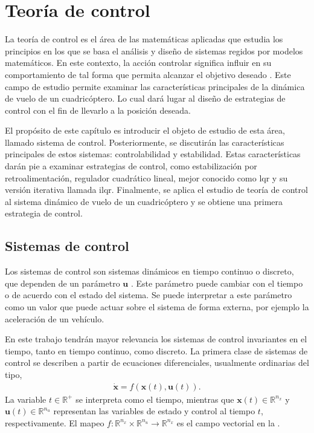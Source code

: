 \chapter{Teoría de control}
\label{chapter:control_theory}
La teoría de control es el área de las matemáticas aplicadas que estudia los principios en los que se basa el análisis y diseño de sistemas regidos por modelos matemáticos. En este contexto, la acción controlar significa influir en su comportamiento de tal forma que permita alcanzar el objetivo deseado \cite{Sontag1998}. Este campo de estudio permite examinar las características principales de la dinámica de vuelo de un cuadricóptero. Lo cual dará lugar al diseño de estrategias de control con el fin de llevarlo a la posición deseada.

El propósito de este capítulo es  introducir el objeto de estudio de esta área, llamado sistema de control. Posteriormente, se discutirán las características principales de estos sistemas: controlabilidad y estabilidad. Estas características darán pie a examinar estrategias de control, como estabilización por retroalimentación, regulador cuadrático lineal, mejor conocido como \acrfull{lqr} y su versión iterativa llamada \acrfull{ilqr}. Finalmente, se aplica el estudio de teoría de control al sistema dinámico de vuelo de un cuadricóptero y se obtiene una primera estrategia de control.

\section{Sistemas de control}

Los sistemas de control son sistemas dinámicos en tiempo continuo o discreto, que dependen de un parámetro $\mathbf{u}$ \cite{Gruene2021}. Este parámetro puede cambiar con el tiempo o de acuerdo con el estado del sistema. Se puede interpretar a este parámetro como un valor que puede actuar sobre el sistema de forma externa, por ejemplo la aceleración de un vehículo.

En este trabajo tendrán mayor relevancia los sistemas de control invariantes en el tiempo, tanto en tiempo continuo, como discreto. La primera clase de sistemas de control se describen a partir de ecuaciones diferenciales, usualmente ordinarias del tipo,
\begin{align}\label{eq:control_system_con}
    \dot{\mathbf{x}}= f(\mathbf{x}(t), \mathbf{u}(t)).
\end{align}
La variable $t\in \mathbb{R}^{+}$ se interpreta como el tiempo, mientras que $\mathbf{x}(t) \in \mathbb{R}^{n_x}$ y $\mathbf{u}(t)\in \mathbb{R}^{n_u}$ representan las variables de estado y control al tiempo $t$, respectivamente. El mapeo $f:\mathbb{R}^{n_x}\times\mathbb{R}^{n_u}\rightarrow\mathbb{R}^{n_x}$
es el campo vectorial en la . \cite{Gruene2021}

